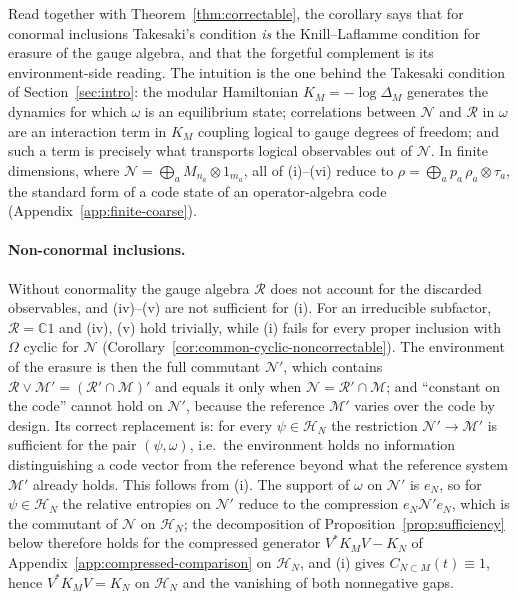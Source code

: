 \documentclass[a4paper,11pt]{article}
\theoremstyle{definition}
\begin{document}
Read together with Theorem~\ref{thm:correctable}, the corollary says that for conormal inclusions Takesaki's condition \emph{is} the Knill--Laflamme condition for erasure of the gauge algebra, and that the forgetful complement is its environment-side reading. The intuition is the one behind the Takesaki condition of Section~\ref{sec:intro}: the modular Hamiltonian $K_M=-\log\Delta_M$ generates the dynamics for which $\omega$ is an equilibrium state; correlations between $\mathcal N$ and $\mathcal R$ in $\omega$ are an interaction term in $K_M$ coupling logical to gauge degrees of freedom; and such a term is precisely what transports logical observables out of $\mathcal N$. In finite dimensions, where $\mathcal N=\bigoplus_aM_{n_a}\otimes1_{m_a}$, all of (i)--(vi) reduce to $\rho=\bigoplus_ap_a\,\rho_a\otimes\tau_a$, the standard form of a code state of an operator-algebra code (Appendix~\ref{app:finite-coarse}).

\paragraph{Non-conormal inclusions.}
Without conormality the gauge algebra $\mathcal R$ does not account for the discarded observables, and (iv)--(v) are not sufficient for (i). For an irreducible subfactor, $\mathcal R=\mathbb C1$ and (iv), (v) hold trivially, while (i) fails for every proper inclusion with $\Omega$ cyclic for $\mathcal N$ (Corollary~\ref{cor:common-cyclic-noncorrectable}). The environment of the erasure is then the full commutant $\mathcal N'$, which contains $\mathcal R\vee\mathcal M'=(\mathcal R'\cap\mathcal M)'$ and equals it only when $\mathcal N=\mathcal R'\cap\mathcal M$; and ``constant on the code'' cannot hold on $\mathcal N'$, because the reference $\mathcal M'$ varies over the code by design. Its correct replacement is: for every $\psi\in\mathcal H_N$ the restriction $\mathcal N'\to\mathcal M'$ is sufficient for the pair $(\psi,\omega)$, i.e.\ the environment holds no information distinguishing a code vector from the reference beyond what the reference system $\mathcal M'$ already holds. This follows from (i). The support of $\omega$ on $\mathcal N'$ is $e_N$, so for $\psi\in\mathcal H_N$ the relative entropies on $\mathcal N'$ reduce to the compression $e_N\mathcal N'e_N$, which is the commutant of $\mathcal N$ on $\mathcal H_N$; the decomposition of Proposition~\ref{prop:sufficiency} below therefore holds for the compressed generator $V^*K_MV-K_N$ of Appendix~\ref{app:compressed-comparison} on $\mathcal H_N$, and (i) gives $C_{N\subset M}(t)\equiv1$, hence $V^*K_MV=K_N$ on $\mathcal H_N$ and the vanishing of both nonnegative gaps.
\end{document}
